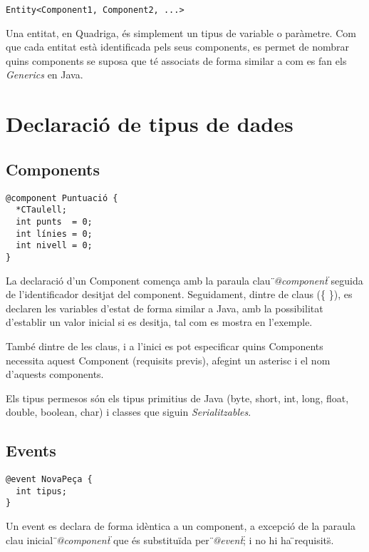 \begin{verbatim}
Entity<Component1, Component2, ...>
\end{verbatim}

Una entitat, en Quadriga, és simplement un tipus de variable o paràmetre. Com que cada entitat està identificada pels seus components, es permet de nombrar quins components se suposa que té associats de forma similar a com es fan els {\em Generics} en Java.

\section{Declaració de tipus de dades}

\subsection{Components}

\begin{verbatim}
@component Puntuació {
  *CTaulell;
  int punts  = 0;
  int línies = 0;
  int nivell = 0;
}
\end{verbatim}

La declaració d'un Component comença amb la paraula clau {\em \"{}@component\"{}} seguida de l'identificador desitjat del component. Seguidament, dintre de claus (\{ \}), es declaren les variables d'estat de forma similar a Java, amb la possibilitat d'establir un valor inicial si es desitja, tal com es mostra en l'exemple.

També dintre de les claus, i a l'inici es pot especificar quins Components necessita aquest Component (requisits previs), afegint un asterisc {\bf *} i el nom d'aquests components.

Els tipus permesos són els tipus primitius de Java (byte, short, int, long, float, double, boolean, char) i classes que siguin {\em Serialitzables}.

\subsection{Events}

\begin{verbatim}
@event NovaPeça {
  int tipus;
}
\end{verbatim}

Un event es declara de forma idèntica a un component, a excepció de la paraula clau inicial {\em \"{}@component\"{}} que és substituïda per {\em \"{}@event\"{}}; i no hi ha \"{}requisits\"{}.

